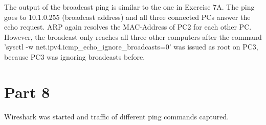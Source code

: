 \documentclass[a4paper, 11pt]{article}
\begin{document}
The output of the broadcast ping is similar to the one in Exercise 7A. The ping goes to 10.1.0.255 (broadcast address) and all three connected PCs answer the echo request.
ARP again resolves the MAC-Address of PC2 for each other PC. However, the broadcast only reaches all three other computers after the command 
'sysctl -w net.ipv4.icmp\_echo\_ignore\_broadcasts=0' was issued as root on PC3, because PC3 was ignoring broadcasts before. 

\section{Part 8}

Wireshark was started and traffic of different ping commands captured.
\end{document}
